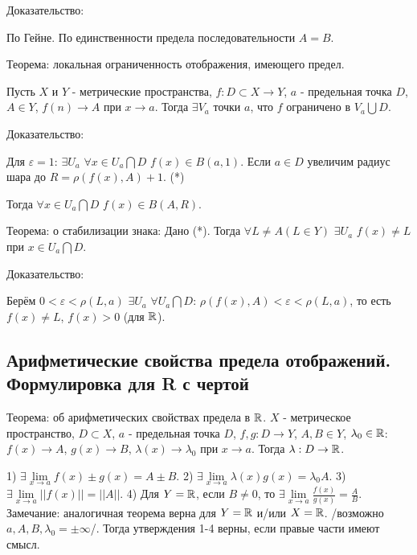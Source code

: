Доказательство:

По Гейне. По единственности предела последовательности $A = B$.

Теорема: локальная ограниченность отображения, имеющего предел.

Пусть $X$ и $Y$ - метрические пространства, $f: D \subset X \rightarrow Y$, $a$ - предельная точка $D$, $A \in Y$, $f(n) \rightarrow A$ при $x \rightarrow a$. Тогда $\exists V_a$ точки $a$, что $f$ ограничено в $V_a \bigcup D$.

Доказательство:

Для $\varepsilon = 1$: $\exists U_a$ $\forall x \in U_a \bigcap D$ $f(x) \in B(a, 1)$. Если $a \in D$ увеличим радиус шара до $R = \rho(f(x), A) + 1$. (*)

Тогда $\forall x \in U_a \bigcap D$ $f(x) \in B(A, R)$.

Теорема: о стабилизации знака: Дано (*). Тогда $\forall L \neq A (L \in Y)$ $\exists U_a$ $f(x) \neq L$ при $x \in U_a \bigcap D$.

Доказательство:

Берём $0 < \varepsilon < \rho(L, a)$ $\exists U_a$ $\forall U_a \bigcap D$: $\rho(f(x), A) < \varepsilon < \rho(L, a)$, то есть $f(x) \neq L$, $f(x) > 0$ (для $\operatorname*{\mathbb{R}}$).

\newpage
\subsection{Арифметические свойства предела отображений. Формулировка для R с чертой}

Теорема: об арифметических свойствах предела в $\operatorname*{\mathbb{R}}$. $X$ - метрическое пространство, $D \subset X$, $a$ - предельная точка $D$, $f, g: D \rightarrow Y$, $A, B \in Y$, $\lambda_0 \in \operatorname*{\mathbb{R}}$: $f(x) \rightarrow A$, $g(x) \rightarrow B$, $\lambda(x) \rightarrow \lambda_0$ при $x \rightarrow a$. 
Тогда $\lambda: D \rightarrow \operatorname*{\mathbb{R}}$. 

1) $\exists \lim\limits_{x \to a} f(x) \pm g(x) = A \pm B$.
2) $\exists \lim\limits_{x \to a} \lambda(x)g(x) = \lambda_0 A$.
3) $\exists \lim\limits_{x \to a} ||f(x)|| = ||A||$.
4) Для $Y = \operatorname*{\mathbb{R}}$, если $B \neq 0$, то $\exists \lim\limits_{x \to a} \frac{f(x)}{g(x)} = \frac{A}{B}$. 
Замечание: аналогичная теорема верна для $Y = \operatorname*{\mathbb{R}}$ и/или $X = \operatorname*{\mathbb{R}}$. /возможно $a, A, B, \lambda_0 = \pm \infty$/. Тогда утверждения 1-4 верны, если правые части имеют смысл.

